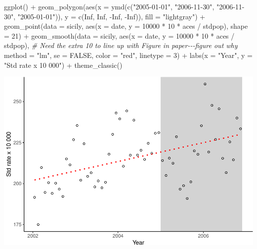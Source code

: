 \documentclass[
]{book}
\newenvironment{Shaded}{\begin{snugshade}}{\end{snugshade}}
\newcommand{\AttributeTok}[1]{\textcolor[rgb]{0.77,0.63,0.00}{#1}}
\newcommand{\CommentTok}[1]{\textcolor[rgb]{0.56,0.35,0.01}{\textit{#1}}}
\newcommand{\ConstantTok}[1]{\textcolor[rgb]{0.00,0.00,0.00}{#1}}
\newcommand{\DecValTok}[1]{\textcolor[rgb]{0.00,0.00,0.81}{#1}}
\newcommand{\FunctionTok}[1]{\textcolor[rgb]{0.00,0.00,0.00}{#1}}
\newcommand{\NormalTok}[1]{#1}
\newcommand{\SpecialCharTok}[1]{\textcolor[rgb]{0.00,0.00,0.00}{#1}}
\newcommand{\StringTok}[1]{\textcolor[rgb]{0.31,0.60,0.02}{#1}}
\begin{document}
\begin{Shaded}
\begin{Highlighting}[]
\FunctionTok{ggplot}\NormalTok{() }\SpecialCharTok{+} 
  \FunctionTok{geom\_polygon}\NormalTok{(}\FunctionTok{aes}\NormalTok{(}\AttributeTok{x =} \FunctionTok{ymd}\NormalTok{(}\FunctionTok{c}\NormalTok{(}\StringTok{"2005{-}01{-}01"}\NormalTok{, }\StringTok{"2006{-}11{-}30"}\NormalTok{, }
                         \StringTok{"2006{-}11{-}30"}\NormalTok{, }\StringTok{"2005{-}01{-}01"}\NormalTok{)), }
               \AttributeTok{y =} \FunctionTok{c}\NormalTok{(}\ConstantTok{Inf}\NormalTok{, }\ConstantTok{Inf}\NormalTok{, }\SpecialCharTok{{-}}\ConstantTok{Inf}\NormalTok{, }\SpecialCharTok{{-}}\ConstantTok{Inf}\NormalTok{)), }\AttributeTok{fill =} \StringTok{"lightgray"}\NormalTok{) }\SpecialCharTok{+} 
  \FunctionTok{geom\_point}\NormalTok{(}\AttributeTok{data =}\NormalTok{ sicily, }
             \FunctionTok{aes}\NormalTok{(}\AttributeTok{x =}\NormalTok{ date, }\AttributeTok{y =} \DecValTok{10000} \SpecialCharTok{*} \DecValTok{10} \SpecialCharTok{*}\NormalTok{ aces }\SpecialCharTok{/}\NormalTok{ stdpop), }\AttributeTok{shape =} \DecValTok{21}\NormalTok{) }\SpecialCharTok{+} 
  \FunctionTok{geom\_smooth}\NormalTok{(}\AttributeTok{data =}\NormalTok{ sicily, }
              \FunctionTok{aes}\NormalTok{(}\AttributeTok{x =}\NormalTok{ date, }\AttributeTok{y =} \DecValTok{10000} \SpecialCharTok{*} \DecValTok{10} \SpecialCharTok{*}\NormalTok{ aces }\SpecialCharTok{/}\NormalTok{ stdpop), }\CommentTok{\# Need the extra 10 to line up with Figure in paper{-}{-}{-}figure out why}
              \AttributeTok{method =} \StringTok{"lm"}\NormalTok{, }\AttributeTok{se =} \ConstantTok{FALSE}\NormalTok{, }\AttributeTok{color =} \StringTok{"red"}\NormalTok{, }\AttributeTok{linetype =} \DecValTok{3}\NormalTok{) }\SpecialCharTok{+} 
  \FunctionTok{labs}\NormalTok{(}\AttributeTok{x =} \StringTok{"Year"}\NormalTok{, }\AttributeTok{y =} \StringTok{"Std rate x 10 000"}\NormalTok{) }\SpecialCharTok{+} 
  \FunctionTok{theme\_classic}\NormalTok{()}
\end{Highlighting}
\end{Shaded}

\includegraphics{adv_epi_analysis_files/figure-latex/unnamed-chunk-65-1.pdf}
\end{document}
